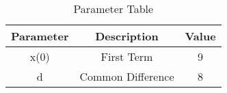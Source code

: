 
\begin{table}[ht]
  \centering
  \begin{tabular}{|c|c|c|}
    \hline
    Parameter & Description & Value \\
    \hline
     x(0) & First Term & 9\\
     \hline
     d & Common Difference & 8\\
    \hline
  \end{tabular}
  \vspace{2mm}
  \caption{Parameter Table}
\end{table}